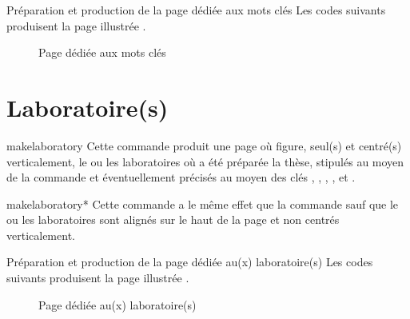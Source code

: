 \begin{dbexample}{Préparation et production de la page dédiée aux mots clés}{}
  Les codes suivants produisent la page illustrée .
\end{dbexample}

\begin{figure}[htbp]
  \centering
  \caption{Page dédiée aux mots clés}
  \label{fig-makekeywords}
\end{figure}

\section{Laboratoire(s)}
\label{sec-laboratoires}

\begin{docCommand}{makelaboratory}{}
  Cette commande produit une page où figure, seul(s) et centré(s)
  verticalement, le ou les laboratoires où a été préparée la thèse, stipulés au
  moyen de la commande  et éventuellement précisés au moyen
  des clés , , ,
  ,  et .
\end{docCommand}
%
\begin{docCommand}{makelaboratory*}{}
  Cette commande a le même effet que la commande  sauf
  que le ou les laboratoires sont alignés sur le haut de la page et non centrés
  verticalement.
\end{docCommand}

\begin{dbexample}{Préparation et production de la page dédiée au(x) laboratoire(s)}{}
  Les codes suivants produisent la page illustrée .
  \NoAutoSpacing%
\end{dbexample}

\begin{figure}[htbp]
  \centering
  \caption{Page dédiée au(x) laboratoire(s)}
  \label{fig-makelaboratory}
\end{figure}

